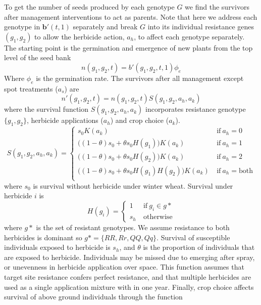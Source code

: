 \documentclass[12pt, a4paper]{article}
\begin{document}
To get the number of seeds produced by each genotype $G$ we find the survivors after management interventions to act as parents. Note that here we address each genotype in $\mathbf{b}'(t, 1)$ separately and break $G$ into its individual resistance genes $(g_1, g_2)$ to allow the herbicide action, $a_h$, to affect each genotype separately. The starting point is the germination and emergence of new plants from the top level of the seed bank
\begin{equation}\label{eq:ag}
	n(g_1, g_2, t) = b'(g_1, g_2, t, 1)\phi_e
\end{equation}
Where $\phi_e$ is the germination rate. The survivors after all management except spot treatments ($a_s$) are
\begin{equation}\label{eq:ab_sur}
	n'(g_1, g_2, t) = n(g_1, g_2, t)S(g_1, g_2, a_h, a_k) 
\end{equation}
where the survival function $S(g_1, g_2, a_h, a_k)$ incorporates resistance genotype $\{g_1, g_2\}$, herbicide applications ($a_h$) and crop choice ($a_k$).
\begin{equation}\label{eq:sur}
	S(g_1, g_2, a_h, a_k) = \begin{cases}
		s_0 K(a_k) &~\text{if} ~ a_h = 0 \\
		\big((1 - \theta)s_0 + \theta s_0 H(g_1)\big) K(a_k) &~\text{if}~a_h = 1 \\
		\big((1 - \theta)s_0 + \theta s_0 H(g_2) \big) K(a_k) &~ \text{if} ~ a_h = 2 \\
		\big((1 - \theta)s_0 + \theta s_0 H(g_1) H(g_2)\big) K(a_k) &~ \text{if} ~ a_h = \text{both} \\	
	\end{cases} 
\end{equation}
where $s_0$ is survival without herbicide under winter wheat. Survival under herbicide $i$ is 
\begin{equation}
	H(g_i) = \begin{cases}
		1 &~\text{if}~g_i \in g*\\
		s_h &~\text{otherwise}
	\end{cases}
\end{equation}
where $g*$ is the set of resistant genotypes. We assume resistance to both herbicides is dominant so $g* = \{RR, Rr, QQ, Qq\}$. Survival of susceptible individuals exposed to herbicide is $s_h$, and $\theta$ is the proportion of individuals that are exposed to herbicide. Individuals may be missed due to emerging after spray, or unevenness in herbicide application over space. This function assumes that target site resistance confers perfect resistance, and that multiple herbicides are used as a single application mixture with in one year. Finally, crop choice affects survival of above ground individuals through the function
\end{document}
